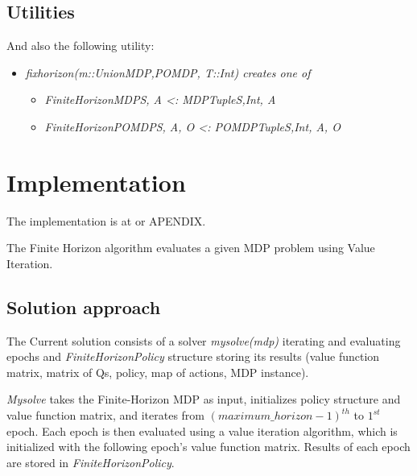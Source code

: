 \subsection{Utilities}
And also the following utility:

\begin{itemize}
    \item \textit{fixhorizon(m::Union{MDP,POMDP}, T::Int) creates one of}
    \begin{itemize}
        \item \textit{FiniteHorizonMDP{S, A} <: MDP{Tuple{S,Int}, A}}
        \item \textit{FiniteHorizonPOMDP{S, A, O} <: POMDP{Tuple{S,Int}, A, O}}
    \end{itemize}
\end{itemize}

\section{Implementation}

The implementation is at \cite{FHPOMDP} or APENDIX.

The Finite Horizon algorithm evaluates a given MDP problem using Value Iteration.  

\subsection{Solution approach}

 The Current solution consists of a solver \textit{mysolve(mdp)} iterating and evaluating epochs and \textit{FiniteHorizonPolicy} structure storing its results (value function matrix, matrix of Qs, policy, map of actions, MDP instance). 
 
 
 \textit{Mysolve} takes the Finite-Horizon MDP as input, initializes policy structure and value function matrix, and iterates from \textit{$(maximum\_horizon-1)^{th}$} to \textit{$1^{st}$} epoch. Each epoch is then evaluated using a value iteration algorithm, which is initialized with the following epoch's value function matrix. Results of each epoch are stored in \textit{FiniteHorizonPolicy}.
 
